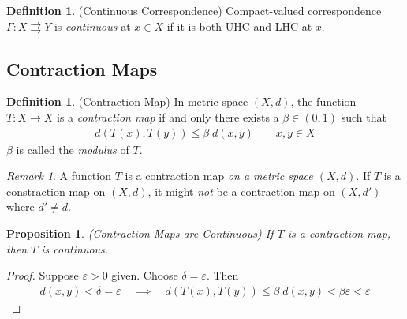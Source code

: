 \documentclass[12pt]{article}
\numberwithin{equation}{section} %
\theoremstyle{plain}
\newtheorem{prop}[thm]{Proposition}
\theoremstyle{definition}
\newtheorem{defn}[thm]{Definition}
\theoremstyle{remark}
\newtheorem*{rmk}{Remark}
\begin{document}
\begin{defn}{(Continuous Correspondence)}
Compact-valued correspondence $\Gamma:X\rightrightarrows Y$ is
\emph{continuous} at $x\in X$ if it is both UHC and LHC at $x$.
\end{defn}

\clearpage
\subsection{Contraction Maps}

\begin{defn}{(Contraction Map)}
In metric space $(X,d)$, the function $T: X\rightarrow X$ is a
\emph{contraction map} if and only there exists a $\beta \in (0,1)$ such
that
\begin{align*}
  d(T(x), T(y)) \leq \beta \; d(x,y)
  \qquad x,y\in X
\end{align*}
$\beta$ is called the \emph{modulus} of $T$.
\end{defn}
\begin{rmk}
A function $T$ is a contraction map \emph{on a metric space $(X,d)$}. If
$T$ is a constraction map on $(X,d)$, it might \emph{not}
be a contraction map on $(X,d')$ where $d'\neq d$.
\end{rmk}

\begin{prop}{\emph{(Contraction Maps are Continuous)}}
If $T$ is a contraction map, then $T$ is continuous.
\end{prop}
\begin{proof}
Suppose $\varepsilon>0$ given. Choose $\delta=\varepsilon$. Then
\begin{align*}
  d(x,y) < \delta=\varepsilon
  \quad\implies\quad
  d(T(x),T(y)) \leq \beta \; d(x,y)
  < \beta \varepsilon < \varepsilon
\end{align*}
\end{proof}
\end{document}
